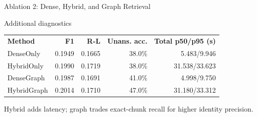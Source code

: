 \begin{frame}{Ablation 2: Dense, Hybrid, and Graph Retrieval}
\scriptsize
\centering
{}
\vspace{0.18cm}
\begin{block}{Additional diagnostics}
\tiny
\begin{tabular}{lrrrr}
\textbf{Method} & \textbf{F1} & \textbf{R-L} & \textbf{Unans. acc.} & \textbf{Total p50/p95 (s)} \\
DenseOnly & 0.1949 & 0.1665 & 38.0\% & 5.483/9.946 \\
HybridOnly & 0.1990 & 0.1719 & 38.0\% & 31.538/33.623 \\
DenseGraph & 0.1987 & 0.1691 & 41.0\% & 4.998/9.750 \\
HybridGraph & 0.2014 & 0.1710 & 47.0\% & 31.180/33.312 \\
\end{tabular}
\end{block}
\vspace{0.06cm}
\centering
\tiny Hybrid adds latency; graph trades exact-chunk recall for higher identity precision.
\end{frame}


